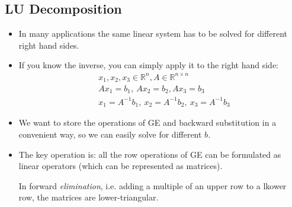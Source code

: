 \subsection{LU Decomposition}
\begin{itemize}
    \item {
        In many applications the same linear system has to be solved for different right
        hand sides.
    }
    \item {
        If you know the inverse, you can simply apply it to the right hand side:
        \begin{align*}
            &
            x_1, x_2, x_3 \in \mathbb{R}^n, A \in \mathbb{R}^{n \times n}
            \\&
            Ax_1 = b_1,\ Ax_2 = b_2, Ax_3 = b_3
            \\&
            x_1 = A^{-1} b_1,\ x_2 = A^{-1} b_2,\ x_3 = A^{-1} b_3
        \end{align*}
    }
    \item {
        We want to store the operations of GE
        and backward substitution in a convenient way,
        so we can easily solve for different $b$.
    }
    \item {
        The key operation is: all the row operations
        of GE can be formulated as linear operators (which can be represented as matrices).
        
        In forward \textit{elimination}, i.e. adding a multiple of an upper row to a lkower row, 
        the matrices are lower-triangular.
    }
\end{itemize}

